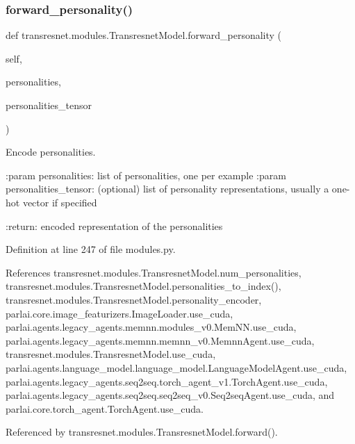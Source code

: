 \subsubsection{\texorpdfstring{forward\+\_\+personality()}{forward\_personality()}}
{\footnotesize\ttfamily def transresnet.\+modules.\+Transresnet\+Model.\+forward\+\_\+personality (\begin{DoxyParamCaption}\item[{}]{self,  }\item[{}]{personalities,  }\item[{}]{personalities\+\_\+tensor }\end{DoxyParamCaption})}

\begin{DoxyVerb}Encode personalities.

:param personalities:
    list of personalities, one per example
:param personalities_tensor:
    (optional) list of personality representations, usually a one-hot
    vector if specified

:return:
    encoded representation of the personalities
\end{DoxyVerb}
 

Definition at line 247 of file modules.\+py.



References transresnet.\+modules.\+Transresnet\+Model.\+num\+\_\+personalities, transresnet.\+modules.\+Transresnet\+Model.\+personalities\+\_\+to\+\_\+index(), transresnet.\+modules.\+Transresnet\+Model.\+personality\+\_\+encoder, parlai.\+core.\+image\+\_\+featurizers.\+Image\+Loader.\+use\+\_\+cuda, parlai.\+agents.\+legacy\+\_\+agents.\+memnn.\+modules\+\_\+v0.\+Mem\+N\+N.\+use\+\_\+cuda, parlai.\+agents.\+legacy\+\_\+agents.\+memnn.\+memnn\+\_\+v0.\+Memnn\+Agent.\+use\+\_\+cuda, transresnet.\+modules.\+Transresnet\+Model.\+use\+\_\+cuda, parlai.\+agents.\+language\+\_\+model.\+language\+\_\+model.\+Language\+Model\+Agent.\+use\+\_\+cuda, parlai.\+agents.\+legacy\+\_\+agents.\+seq2seq.\+torch\+\_\+agent\+\_\+v1.\+Torch\+Agent.\+use\+\_\+cuda, parlai.\+agents.\+legacy\+\_\+agents.\+seq2seq.\+seq2seq\+\_\+v0.\+Seq2seq\+Agent.\+use\+\_\+cuda, and parlai.\+core.\+torch\+\_\+agent.\+Torch\+Agent.\+use\+\_\+cuda.



Referenced by transresnet.\+modules.\+Transresnet\+Model.\+forward().


